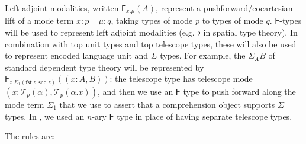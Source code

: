 \documentclass[10pt]{article}
\theoremstyle{definition}
\newcommand\dsd[1]{\ensuremath{\mathsf{#1}}}
\newcommand{\app}[2]{\ensuremath{#1 \: #2}}
\newcommand{\telety}[3]{\ensuremath{(#1{:}#2,#3)}}
\newcommand{\sigmacl}[3]{\ensuremath{(#1{:}#2,#3)}}
\newcommand{\fst}[1]{\app{\dsd{fst}}{#1}}
\newcommand{\snd}[1]{\app{\dsd{snd}}{#1}}
\newcommand\F[2]{\ensuremath{\mathsf{F}_{#1}(#2)}}
\newcommand\El[2]{\mathcal{T}_{#1}(#2)}
\begin{document}
Left adjoint modalities, written $\F{x.\mu}{A}$, represent a
pushforward/cocartesian lift of a mode term $x : p \vdash \mu : q$, taking
types of mode $p$ to types of mode $q$.  $\mathsf{F}$-types will be used
to represent left adjoint modalities (e.g. $\flat$ in spatial type
theory).  In combination with top unit types and top telescope types,
these will also be used to represent encoded language unit and $\Sigma$
types.  For example, the $\Sigma_A B$ of standard dependent type theory
will be represented by $\F{z.\Sigma_1(\fst z, \snd
  z)}{\telety{x}{A}{B}}$: the telescope type has telescope mode
$\sigmacl{x}{\El{p}{\alpha}}{\El{p}{\alpha.x}}$, and then we use an
$\mathsf{F}$ type to push forward along the mode term $\Sigma_1$ that we
use to assert that a comprehension object supports $\Sigma$ types.
In , we used an $n$-ary $\mathsf{F}$ type in
place of having separate telescope types.

The rules are:
\end{document}
